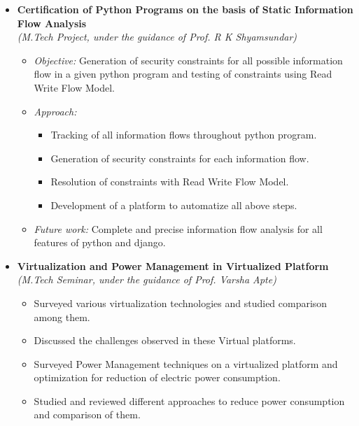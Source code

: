 \begin{itemize}
\item \textbf{Certification of Python Programs on the basis of Static Information Flow Analysis} \\
      \emph{(M.Tech Project, under the guidance of Prof. R K Shyamsundar)}  \\[-0.6cm]
      \begin{itemize}
  \item \textit{Objective:} Generation of security constraints for all possible information flow in a given python program and testing of constraints using Read Write Flow Model.\\[-0.5cm]
 	  	  
  \item \textit{Approach:} \\[-0.5cm]
   \begin{itemize}
 \item Tracking of all information flows throughout python program.
 \item Generation of security constraints for each information flow.
 \item Resolution of constraints with Read Write Flow Model.
 \item Development of a platform to automatize all above steps. \\[-0.5cm]
   \end{itemize}
  \item \textit{Future work:} 
  Complete and precise information flow analysis for all features of python and django.\\[-0.5cm]
  	        \end{itemize}
\item \textbf{Virtualization and Power Management in Virtualized Platform} \\
\emph{(M.Tech Seminar, under the guidance of Prof. Varsha Apte)} \\[-0.6cm]
\begin{itemize}
	\item Surveyed various virtualization technologies and studied comparison among them. \\[-0.5cm]
	\item Discussed the challenges observed in these Virtual platforms. \\[-0.5cm]
	\item Surveyed Power Management techniques on a virtualized platform and optimization for reduction of electric power consumption. \\[-0.5cm]
	\item Studied and reviewed different approaches to reduce power consumption and comparison of them.
\end{itemize}


\end{itemize}
